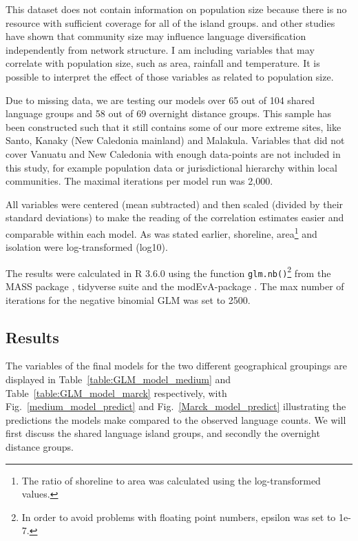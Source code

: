 \documentclass[a4paper,10pt]{article} %
\begin{document}
This dataset does not contain information on population size because there is no resource with sufficient coverage for all of the island groups. \citet{raviv2019larger} and other studies have shown that community size may influence language diversification independently from network structure. I am including variables that may correlate with population size, such as area, rainfall and temperature. It is possible to interpret the effect of those variables as related to population size.

Due to missing data, we are testing our models over 65 out of 104 shared language groups and 58 out of 69 overnight distance groups. This sample has been constructed such that it still contains some of our more extreme sites, like Santo, Kanaky (New Caledonia mainland) and Malakula. Variables that did not cover Vanuatu and New Caledonia with enough data-points are not included in this study, for example population data or jurisdictional hierarchy within local communities. The maximal iterations per model run was 2,000.

All variables were centered (mean subtracted) and then scaled (divided by their standard deviations) to make the reading of the correlation estimates easier and comparable within each model. As was stated earlier, shoreline, area\footnote{The ratio of shoreline to area was calculated using the log-transformed values.} and isolation were log-transformed (log10).

The results were calculated in R 3.6.0 \citep{R} using the function \texttt{glm.nb()}\footnote{In order to avoid problems with floating point numbers, epsilon was set to 1e-7.} from the MASS package \citet{choi2014msstats}, tidyverse suite \citep{tidyverse13} and the modEvA-package \citep{barbosa2016package}. The max number of iterations for the negative binomial GLM was set to 2500.

\subsection{Results}
The variables of the final models for the two different geographical groupings are displayed in Table~\ref{table:GLM_model_medium} and Table~\ref{table:GLM_model_marck} respectively, with Fig.~\ref{medium_model_predict} and Fig.~\ref{Marck_model_predict} illustrating the predictions the models make compared to the observed language counts. We will first discuss the shared language island groups, and secondly the overnight distance groups.
\end{document}
